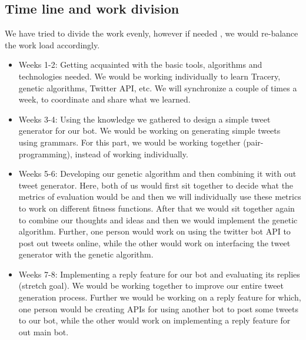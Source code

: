 \documentclass[11pt]{article}
\begin{document}
        \subsection{Time line and work division}
        We have tried to divide the work evenly, however if needed , we would re-balance the work load accordingly.
        \begin{itemize}
            \item Weeks 1-2: Getting acquainted with the basic tools, algorithms and technologies needed. We would be working individually to learn Tracery, genetic algorithms, Twitter API, etc. We will synchronize a couple of times a week, to coordinate and share what we learned.
            \item Weeks 3-4:  Using the knowledge we gathered to design a simple tweet generator for our bot. We would be working on generating simple tweets using grammars. For this part, we would be working together (pair-programming), instead of working individually.
            \item Weeks 5-6: Developing our genetic algorithm and then combining it with out tweet generator. Here, both of us would first sit together to decide what the metrics of evaluation would be and then we will individually use these metrics to work on different fitness functions. After that we would sit together again to combine our thoughts and ideas and then we would implement the genetic algorithm. Further, one person would work on using the twitter bot API to post out tweets online, while the other would work on interfacing the tweet generator with the genetic algorithm.
            \item Weeks 7-8: Implementing a reply feature for our bot and evaluating its replies (stretch goal). We would be working together to improve our entire tweet generation process. Further we would be working on a reply feature for which, one person would be creating APIs for using another bot to post some tweets to our bot, while the other would work on implementing a reply feature for out main bot.
        \end{itemize}
\end{document}
